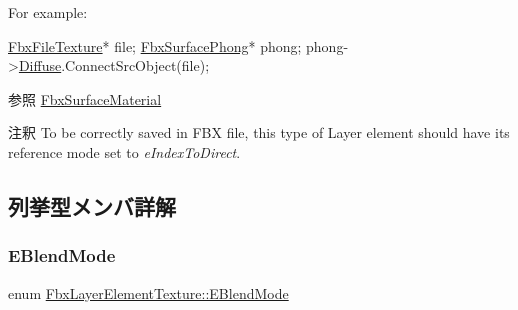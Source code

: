 For example\+:


\begin{DoxyCode}
\hyperlink{class_fbx_file_texture}{FbxFileTexture}*  file;
\hyperlink{class_fbx_surface_phong}{FbxSurfacePhong}* phong;
phong->\hyperlink{class_fbx_surface_lambert_a95f3a1ebeb92afb1e41a83088cc7e71f}{Diffuse}.ConnectSrcObject(file);
\end{DoxyCode}
 \begin{DoxySeeAlso}{参照}
\hyperlink{class_fbx_surface_material}{Fbx\+Surface\+Material}
\end{DoxySeeAlso}
\begin{DoxyRemark}{注釈}
To be correctly saved in F\+BX file, this type of Layer element should have its reference mode set to {\itshape e\+Index\+To\+Direct}. 
\end{DoxyRemark}


\subsection{列挙型メンバ詳解}
\mbox{\label{class_fbx_layer_element_texture_a95d9277da243733eae14d4d0141f77ea}} 
\subsubsection{\texorpdfstring{E\+Blend\+Mode}{EBlendMode}}
{\footnotesize\ttfamily enum \hyperlink{class_fbx_layer_element_texture_a95d9277da243733eae14d4d0141f77ea}{Fbx\+Layer\+Element\+Texture\+::\+E\+Blend\+Mode}}

